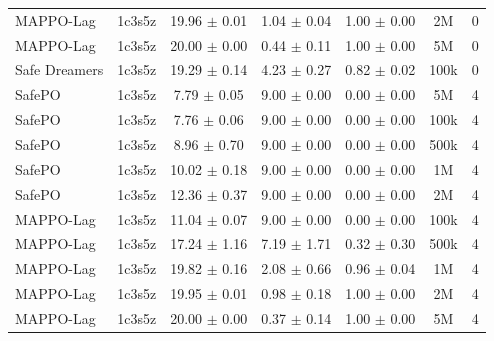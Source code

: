 \documentclass{article}
\begin{document}
\begin{longtable}{lcccccc}
MAPPO-Lag & 1c3s5z & \textcolor{red!70!black}{19.96 $\pm$ 0.01} & \textcolor{red!70!black}{1.04 $\pm$ 0.04} & \textcolor{red!70!black}{1.00 $\pm$ 0.00} & 2M & 0 \\
MAPPO-Lag & 1c3s5z & \textcolor{red!70!black}{20.00 $\pm$ 0.00} & \textcolor{red!70!black}{0.44 $\pm$ 0.11} & \textcolor{red!70!black}{1.00 $\pm$ 0.00} & 5M & 0 \\
Safe Dreamers & 1c3s5z & 19.29 $\pm$ 0.14 & 4.23 $\pm$ 0.27 & 0.82 $\pm$ 0.02 & 100k & 0 \\
\midrule
SafePO & 1c3s5z & \textcolor{green!60!black}{7.79 $\pm$ 0.05} & \textcolor{green!60!black}{9.00 $\pm$ 0.00} & \textcolor{green!60!black}{0.00 $\pm$ 0.00} & 5M & 4 \\
SafePO & 1c3s5z & \textcolor{green!60!black}{7.76 $\pm$ 0.06} & \textcolor{green!60!black}{9.00 $\pm$ 0.00} & \textcolor{green!60!black}{0.00 $\pm$ 0.00} & 100k & 4 \\
SafePO & 1c3s5z & \textcolor{green!60!black}{8.96 $\pm$ 0.70} & \textcolor{green!60!black}{9.00 $\pm$ 0.00} & \textcolor{green!60!black}{0.00 $\pm$ 0.00} & 500k & 4 \\
SafePO & 1c3s5z & \textcolor{green!60!black}{10.02 $\pm$ 0.18} & \textcolor{green!60!black}{9.00 $\pm$ 0.00} & \textcolor{green!60!black}{0.00 $\pm$ 0.00} & 1M & 4 \\
SafePO & 1c3s5z & \textcolor{green!60!black}{12.36 $\pm$ 0.37} & \textcolor{green!60!black}{9.00 $\pm$ 0.00} & \textcolor{green!60!black}{0.00 $\pm$ 0.00} & 2M & 4 \\
MAPPO-Lag & 1c3s5z & \textcolor{green!60!black}{11.04 $\pm$ 0.07} & \textcolor{green!60!black}{9.00 $\pm$ 0.00} & \textcolor{green!60!black}{0.00 $\pm$ 0.00} & 100k & 4 \\
MAPPO-Lag & 1c3s5z & \textcolor{green!60!black}{17.24 $\pm$ 1.16} & \textcolor{green!60!black}{7.19 $\pm$ 1.71} & \textcolor{green!60!black}{0.32 $\pm$ 0.30} & 500k & 4 \\
MAPPO-Lag & 1c3s5z & \textcolor{red!70!black}{19.82 $\pm$ 0.16} & \textcolor{red!70!black}{2.08 $\pm$ 0.66} & \textcolor{red!70!black}{0.96 $\pm$ 0.04} & 1M & 4 \\
MAPPO-Lag & 1c3s5z & \textcolor{red!70!black}{19.95 $\pm$ 0.01} & \textcolor{red!70!black}{0.98 $\pm$ 0.18} & \textcolor{red!70!black}{1.00 $\pm$ 0.00} & 2M & 4 \\
MAPPO-Lag & 1c3s5z & \textcolor{red!70!black}{20.00 $\pm$ 0.00} & \textcolor{red!70!black}{0.37 $\pm$ 0.14} & \textcolor{red!70!black}{1.00 $\pm$ 0.00} & 5M & 4 \\

\end{longtable}
\end{document}
